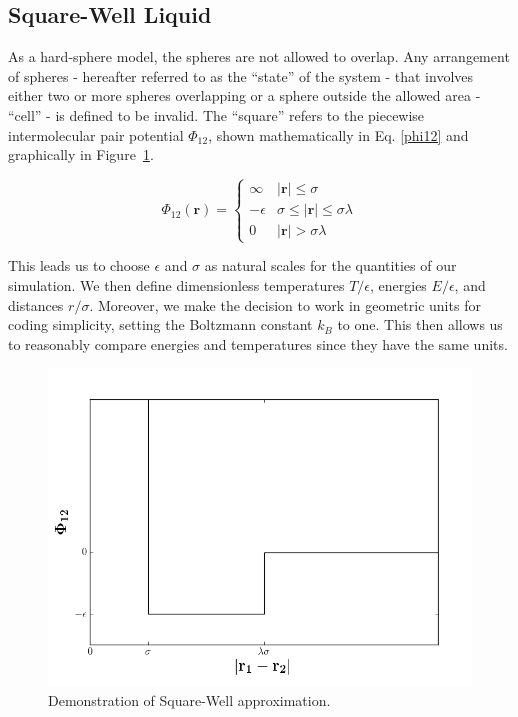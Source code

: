 \documentclass[12pt]{article}
\renewcommand{\vec}[1]{\mathbf{#1}}
\begin{document}
\subsection{Square-Well Liquid}
As a hard-sphere model, the spheres are not allowed to overlap. Any arrangement of spheres - hereafter referred to as the ``state'' of the system - that involves either two or more spheres overlapping or a sphere outside the allowed area - ``cell'' - is defined to be invalid. The ``square'' refers to the piecewise intermolecular pair potential $\Phi_{12}$, shown mathematically in Eq. \ref{phi12} and graphically in Figure~\ref{sw_phi}.

\begin{equation} 
\Phi_{12}(\vec{r}) = \begin{cases}\infty & |\vec{r}|\leq \sigma\\ -\epsilon & \sigma \leq |\vec{r}| \leq \sigma\lambda\\ 0 & |\vec{r}| > \sigma\lambda \end{cases}
\label{phi12}
\end{equation}

This leads us to choose $\epsilon$ and $\sigma$ as natural scales for the quantities of our simulation. We then define dimensionless temperatures $T/\epsilon$, energies $E/\epsilon$, and distances $r/\sigma$. Moreover, we make the decision to work in geometric units for coding simplicity, setting the Boltzmann constant $k_B$ to one. This then allows us to reasonably compare energies and temperatures since they have the same units.

\begin{figure}
    \centering
    \includegraphics[width=.75\textwidth]{SWF-E.png}
    \caption{Demonstration of Square-Well approximation.}
    \label{sw_phi}
\end{figure}
\end{document}
